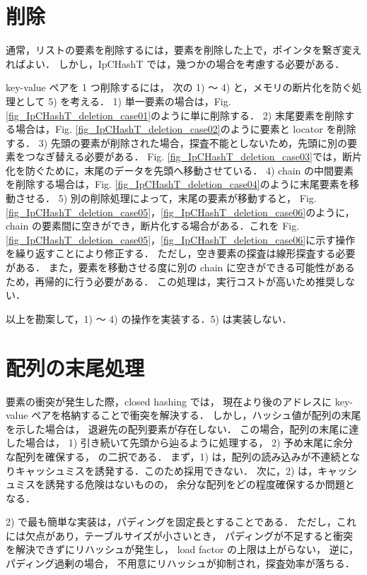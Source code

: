 \section{削除}

通常，リストの要素を削除するには，要素を削除した上で，ポインタを繋ぎ変えればよい．
しかし，IpCHashT では，幾つかの場合を考慮する必要がある．

key-value ペアを 1 つ削除するには，
次の 1) 〜 4) と，メモリの断片化を防ぐ処理として 5) を考える．
1) 単一要素の場合は，Fig. \ref{fig_IpCHashT_deletion_case01}のように単に削除する．
2) 末尾要素を削除する場合は，Fig. \ref{fig_IpCHashT_deletion_case02}のように要素と locator を削除する．
3) 先頭の要素が削除された場合，探査不能としないため，先頭に別の要素をつなぎ替える必要がある．
Fig. \ref{fig_IpCHashT_deletion_case03}では，断片化を防ぐために，末尾のデータを先頭へ移動させている．
4) chain の中間要素を削除する場合は，Fig. \ref{fig_IpCHashT_deletion_case04}のように末尾要素を移動させる．
5) 別の削除処理によって，末尾の要素が移動すると，
Fig. \ref{fig_IpCHashT_deletion_case05}，\ref{fig_IpCHashT_deletion_case06}のように，
chain の要素間に空きができ，断片化する場合がある．これを
Fig. \ref{fig_IpCHashT_deletion_case05}，\ref{fig_IpCHashT_deletion_case06}に示す操作を繰り返すことにより修正する．
ただし，空き要素の探査は線形探査する必要がある．
また，要素を移動させる度に別の chain に空きができる可能性があるため，再帰的に行う必要がある．
この処理は，実行コストが高いため推奨しない．

以上を勘案して，1) 〜 4) の操作を実装する．5) は実装しない．

\section{配列の末尾処理}

要素の衝突が発生した際，closed hashing では，
現在より後のアドレスに key-value ペアを格納することで衝突を解決する．
しかし，ハッシュ値が配列の末尾を示した場合は，
退避先の配列要素が存在しない．
この場合，配列の末尾に達した場合は，
1) 引き続いて先頭から辿るように処理する，
2) 予め末尾に余分な配列を確保する，
の二択である．
まず，1) は，配列の読み込みが不連続となりキャッシュミスを誘発する．このため採用できない．
次に，2) は，キャッシュミスを誘発する危険はないものの，
余分な配列をどの程度確保するか問題となる．

2) で最も簡単な実装は，パディングを固定長とすることである．
ただし，これには欠点があり，テーブルサイズが小さいとき，
パディングが不足すると衝突を解決できずにリハッシュが発生し，
load factor の上限は上がらない，
逆に，パディング過剰の場合，
不用意にリハッシュが抑制され，探査効率が落ちる．

